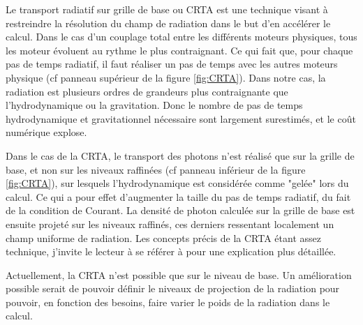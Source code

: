 Le transport radiatif sur grille de base ou \ac{CRTA} est une technique visant à restreindre la résolution du champ de radiation dans le but d'en accélérer le calcul.
Dans le cas d'un couplage total entre les différents moteurs physiques, tous les moteur évoluent au rythme le plus contraignant.
Ce qui fait que, pour chaque pas de temps radiatif, il faut réaliser un pas de temps avec les autres moteurs physique (cf panneau supérieur de la figure \ref{fig:CRTA}).
Dans notre cas, la radiation est plusieurs ordres de grandeurs plus contraignante que l'hydrodynamique ou la gravitation.
Donc le nombre de pas de temps hydrodynamique et gravitationnel nécessaire sont largement surestimés, et le coût numérique explose.

Dans le cas de la \ac{CRTA}, le transport des photons n'est réalisé que sur la grille de base, et non sur les niveaux raffinées (cf panneau inférieur de la figure \ref{fig:CRTA}), sur lesquels l'hydrodynamique est considérée comme "gelée" lors du calcul.
Ce qui a pour effet d'augmenter la taille du pas de temps radiatif, du fait de la condition de Courant.
La densité de photon calculée sur la grille de base est ensuite projeté sur les niveaux raffinés, ces derniers ressentant localement un champ uniforme de radiation.
Les concepts précis de la \ac{CRTA} étant assez technique, j'invite le lecteur à se référer à \cite{aubert_emma:_2015} pour une explication plus détaillée.

Actuellement, la \ac{CRTA} n'est possible que sur le niveau de base.
Un amélioration possible serait de pouvoir définir le niveaux de projection de la radiation pour pouvoir, en fonction des besoins, faire varier le poids de la radiation dans le calcul.



